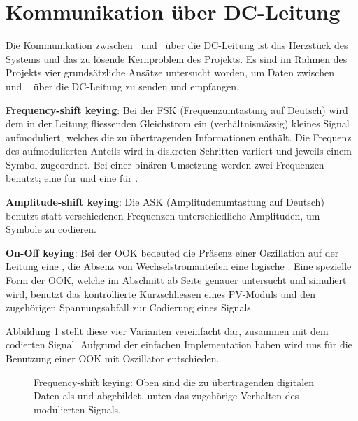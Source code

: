 \section{Kommunikation \"uber DC-Leitung}
\label{sec:commDCLine}
\enlargethispage{2em}

Die Kommunikation  zwischen \Sensor~und \Master~\"uber die  DC-Leitung ist das
Herzst\"uck des Systems und das zu l\"osende Kernproblem des Projekts. Es sind
im Rahmen des  Projekts vier grunds\"atzliche Ans\"atze  untersucht worden, um
Daten  zwischen \Sensor~ und  \Master~  \"uber die  DC-Leitung  zu senden  und
empfangen.

\textbf{Frequency-shift keying}: Bei  der FSK (Frequenzumtastung  auf Deutsch)
wird  dem in  der Leitung  fliessenden Gleichstrom  ein (verh\"altnism\"assig)
kleines  Signal aufmoduliert,  welches  die  zu \"ubertragenden  Informationen
enth\"alt. Die Frequenz des aufmodulierten Anteils wird in diskreten Schritten
variiert und  jeweils einem  Symbol zugeordnet. Bei einer  bin\"aren Umsetzung
werden zwei Frequenzen benutzt; eine f\"ur  und eine f\"ur .

\textbf{Amplitude-shift  keying}: Die  ASK (Amplitudenumtastung  auf  Deutsch)
benutzt statt verschiedenen Frequenzen unterschiedliche Amplituden, um Symbole
zu codieren.

\textbf{On-Off keying}: Bei  der OOK bedeuted die  Pr\"asenz einer Oszillation
auf  der  Leitung eine  ,  die  Absenz von  Wechselstromanteilen  eine
logische  . Eine   spezielle  Form   der  OOK,  welche   im  Abschnitt
\emph{}  ab  Seite  \pageref{sec:simu:short}  genauer
untersucht  und  simuliert  wird,  benutzt  das  kontrollierte  Kurzschliessen
eines  PV-Moduls und  den  zugeh\"origen Spannungsabfall  zur Codierung  eines
Signals.

Abbildung   \ref{fig:modulation:concepts}   stellt    diese   vier   Varianten
vereinfacht dar,  zusammen mit dem  codierten Signal.  Aufgrund  der einfachen
Implementation haben  wird uns  f\"ur die Benutzung  einer OOK  mit Oszillator
entschieden.

\begin{figure}[h!tb]
    \centering
    
    \caption[Modulationsmethoden]{%
        Frequency-shift  keying: Oben sind  die  zu \"ubertragenden  digitalen
        Daten  als   und   abgebildet, unten  das zugeh\"orige
        Verhalten des modulierten Signals.%
    }
    \label{fig:modulation:concepts}
\end{figure}

